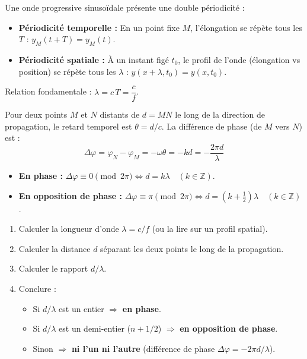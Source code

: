 \documentclass[11pt]{article}
\begin{document}
\begin{propriete}
Une onde progressive sinusoïdale présente une double périodicité :
\begin{itemize}
    \item \textbf{Périodicité temporelle :} En un point fixe $M$, l'élongation se répète tous les $T$ : $y_M(t+T) = y_M(t)$.
    \item \textbf{Périodicité spatiale :} À un instant figé $t_0$, le profil de l'onde (élongation vs position) se répète tous les $\lambda$ : $y(x+\lambda, t_0) = y(x, t_0)$.
\end{itemize}
Relation fondamentale : $\boxed{\lambda = c\,T = \dfrac{c}{f}}$.
\end{propriete}

\begin{propriete}
Pour deux points $M$ et $N$ distants de $d = MN$ le long de la direction de propagation, le retard temporel est $\theta = d/c$. La différence de phase (de $M$ vers $N$) est :
\[ \Delta\varphi = \varphi_N - \varphi_M = -\omega\theta = -k d = -\frac{2\pi d}{\lambda} \]
\begin{itemize}
    \item \textbf{En phase :} $\Delta\varphi \equiv 0 \pmod{2\pi} \iff d = k\lambda \quad (k \in \mathbb{Z})$.
    \item \textbf{En opposition de phase :} $\Delta\varphi \equiv \pi \pmod{2\pi} \iff d = \left(k+\frac{1}{2}\right)\lambda \quad (k \in \mathbb{Z})$.
\end{itemize}
\end{propriete}

\begin{methode}
\begin{enumerate}
    \item Calculer la longueur d'onde $\lambda = c/f$ (ou la lire sur un profil spatial).
    \item Calculer la distance $d$ séparant les deux points le long de la propagation.
    \item Calculer le rapport $d/\lambda$.
    \item Conclure :
    \begin{itemize}
        \item Si $d/\lambda$ est un entier $\Rightarrow$ \textbf{en phase}.
        \item Si $d/\lambda$ est un demi-entier ($n+1/2$) $\Rightarrow$ \textbf{en opposition de phase}.
        \item Sinon $\Rightarrow$ \textbf{ni l'un ni l'autre} (différence de phase $\Delta\varphi = -2\pi d/\lambda$).
    \end{itemize}
\end{enumerate}
\end{methode}
\end{document}
